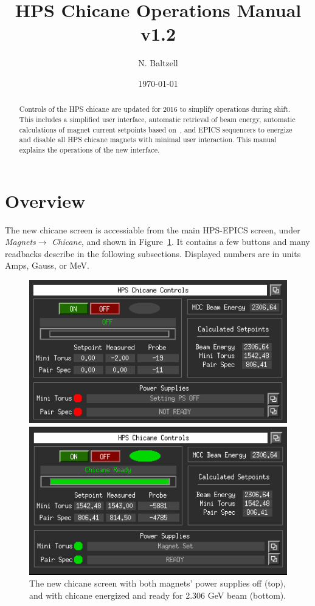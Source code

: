 \documentclass[amsmath,amssymb,notitlepage,12pt]{revtex4-1}
\begin{document}
\title{HPS Chicane Operations Manual v1.2}
\author{N. Baltzell}
\date{\today}
\begin{abstract}
    Controls of the HPS chicane are updated for 2016 to simplify operations during shift.  This includes a simplified user interface, automatic retrieval of beam energy, automatic calculations of magnet current setpoints based on~\cite{chicaneSettings}, and EPICS sequencers to energize and disable all HPS chicane magnets with minimal user interaction.  This manual explains the operations of the new interface. 
\end{abstract}

\maketitle
\tableofcontents
\newpage

\section{Overview}
The new chicane screen is accessiable from the main HPS-EPICS screen, under {\em Magnets}$ \to$ {\em Chicane}, and shown in Figure~\ref{fig:guiChicaneOff}.  It contains a few buttons and many readbacks describe in the following subsections.  Displayed numbers are in units Amps, Gauss, or MeV. 
\begin{figure}[htbp]
    \centering\includegraphics[width=12cm]{pics/guiOFF}
    
    \centering\includegraphics[width=12cm]{pics/guiON}
    \caption{The new chicane screen with both magnets' power supplies off (top), and with chicane energized and ready for 2.306 GeV beam (bottom).\label{fig:guiChicaneOff}}
\end{figure}
\end{document}
